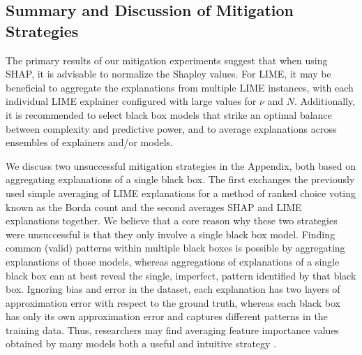\documentclass[12pt]{article}  %
\begin{document}
    \subsection{Summary and Discussion of Mitigation Strategies}
            \label{sec:summary_and_strategies}
            The primary results of our mitigation experiments suggest that when using SHAP, it is advisable to normalize the Shapley values. For LIME, it may be beneficial to aggregate the explanations from multiple LIME instances, with each individual LIME explainer configured with large values for $\nu$ and $N$. Additionally, it is recommended to select black box models that strike an optimal balance between complexity and predictive power, and to average explanations across ensembles of explainers and/or models.

            We discuss two unsuccessful mitigation strategies in the Appendix, both based on aggregating explanations of a single black box. The first exchanges the previously used simple averaging of LIME explanations for a method of ranked choice voting known as the Borda count and the second averages SHAP and LIME explanations together. We believe that a core reason why these two strategies were unsuccessful is that they only involve a single black box model. Finding common (valid) patterns within multiple black boxes is possible by aggregating explanations of those models, whereas aggregations of explanations of a single black box can at best reveal the single, imperfect, pattern identified by that black box. Ignoring bias and error in the dataset, each explanation has two layers of approximation error with respect to the ground truth, whereas each black box has only its own approximation error and captures different patterns in the training data. Thus, researchers may find averaging feature importance values obtained by many models both a useful and intuitive strategy \citep{dong2020variable,donnelly2023rashomon}.  %
            
\end{document}
